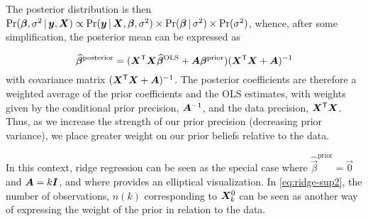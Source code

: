 The posterior distribution is then
$\Pr (\bm{\beta}, \sigma^2 \, | \, \bm{y}, \bm{X}) \propto \Pr (\bm{y} \, | \, \bm{X}, \bm{\beta}, \sigma^2) \times
\Pr (\bm{\beta} \, | \, \sigma^2) \times \Pr (\sigma^2)$,
whence, after some simplification,
the posterior mean can be expressed as

\begin{equation}\label{eq:bayes-posterior}
\widehat{\bm{\beta}}^{\mathrm{posterior}} =
(\bm{X}^\mathsf{T} \bm{X}\widehat{\bm{\beta}}^{\mathrm{OLS}} + \bm{A} \bm{\beta}^{\mathrm{prior}})
(\bm{X}^\mathsf{T} \bm{X}+\bm{A})^{-1}
\end{equation}
with covariance matrix $(\bm{X}^\mathsf{T} \bm{X}+\bm{A})^{-1}$. The posterior coefficients are 
therefore a weighted average of
the prior coefficients and the OLS estimates, with weights given by the conditional prior precision, $\bm{A}^{-1}$,
and the data precision, $\bm{X}^\mathsf{T}\bm{X}$.  Thus, as we increase the strength of our prior precision (decreasing
prior variance), we place greater weight on our prior beliefs relative to the data.

In this context, ridge regression can be seen as the special case 
where $\widehat{\vec{\beta}}^{\mathrm{prior}} = \vec{0}$ and $\bm{A} = k \bm{I}$,
and where  provides an elliptical visualization. In \eqref{eq:ridge-sup2}, the number of observations,
$n(k)$ corresponding to $\bm{X}_k^0$ can be seen as another way of expressing the weight of the prior in relation to the data.




